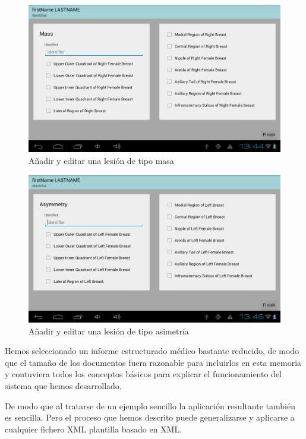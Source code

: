 \begin{figure}[ht]
\centering
\includegraphics[scale=0.4]{./imgs/verificacion/editMass.png}
\caption{Añadir y editar una lesión de tipo masa}
\label{ver:editMass}
\end{figure}

\begin{figure}[ht]
\centering
\includegraphics[scale=0.4]{./imgs/verificacion/asymmetry.png}
\caption{Añadir y editar una lesión de tipo asimetría}
\label{ver:asymmetry}
\end{figure}

Hemos seleccionado un informe estructurado médico bastante reducido, de modo que el tamaño de los documentos fuera razonable para incluirlos en esta memoria y contuviera todos los conceptos básicos para explicar el funcionamiento del sistema que hemos desarrollado.\par
De modo que al tratarse de un ejemplo sencillo la aplicación resultante también es sencilla. Pero el proceso que hemos descrito puede generalizarse y aplicarse a cualquier fichero XML plantilla basado en XML.